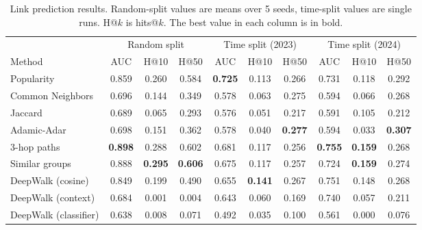 \begin{table}[t]
\centering
\caption{Link prediction results. Random-split values are means over 5 seeds, time-split values are single runs. H@$k$ is hits@$k$. The best value in each column is in bold.}
\label{tab:results}
\small
\begin{tabular}{lccccccccc}
\toprule
 & \multicolumn{3}{c}{Random split} & \multicolumn{3}{c}{Time split (2023)} & \multicolumn{3}{c}{Time split (2024)} \\
\cmidrule(lr){2-4} \cmidrule(lr){5-7} \cmidrule(lr){8-10}
Method & AUC & H@10 & H@50 & AUC & H@10 & H@50 & AUC & H@10 & H@50 \\
\midrule
Popularity & 0.859 & 0.260 & 0.584 & \textbf{0.725} & 0.113 & 0.266 & 0.731 & 0.118 & 0.292 \\
Common Neighbors & 0.696 & 0.144 & 0.349 & 0.578 & 0.063 & 0.275 & 0.594 & 0.066 & 0.268 \\
Jaccard & 0.689 & 0.065 & 0.293 & 0.576 & 0.051 & 0.217 & 0.591 & 0.105 & 0.212 \\
Adamic-Adar & 0.698 & 0.151 & 0.362 & 0.578 & 0.040 & \textbf{0.277} & 0.594 & 0.033 & \textbf{0.307} \\
3-hop paths & \textbf{0.898} & 0.288 & 0.602 & 0.681 & 0.117 & 0.256 & \textbf{0.755} & \textbf{0.159} & 0.268 \\
Similar groups & 0.888 & \textbf{0.295} & \textbf{0.606} & 0.675 & 0.117 & 0.257 & 0.724 & \textbf{0.159} & 0.274 \\
\midrule
DeepWalk (cosine) & 0.849 & 0.199 & 0.490 & 0.655 & \textbf{0.141} & 0.267 & 0.751 & 0.148 & 0.268 \\
DeepWalk (context) & 0.684 & 0.001 & 0.004 & 0.643 & 0.060 & 0.169 & 0.740 & 0.057 & 0.211 \\
DeepWalk (classifier) & 0.638 & 0.008 & 0.071 & 0.492 & 0.035 & 0.100 & 0.561 & 0.000 & 0.076 \\
\bottomrule
\end{tabular}
\end{table}
